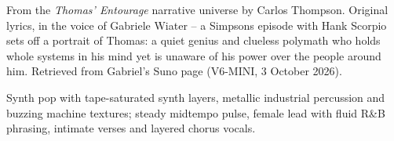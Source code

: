 
\label{sec:my-quiet-genius}
\begin{notes}
From the \emph{Thomas’ Entourage} narrative universe by Carlos Thompson. Original lyrics, in the voice of Gabriele Wiater -- a Simpsons episode with Hank Scorpio sets off a portrait of Thomas: a quiet genius and clueless polymath who holds whole systems in his mind yet is unaware of his power over the people around him. Retrieved from Gabriel's Suno page (V6-MINI, 3 October 2026).
\end{notes}
\begin{style}
Synth pop with tape-saturated synth layers, metallic industrial percussion and buzzing machine textures; steady midtempo pulse, female lead with fluid R\&B phrasing, intimate verses and layered chorus vocals.
\end{style}
